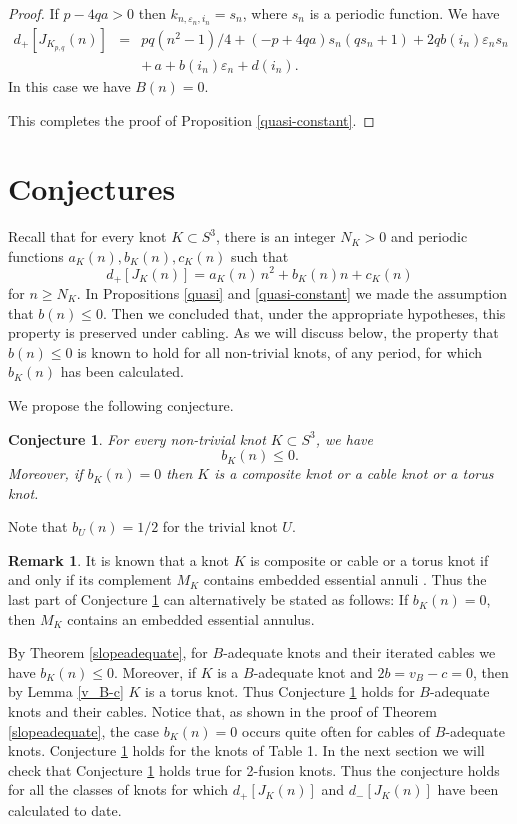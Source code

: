 \documentclass[11pt]{amsart}
\newtheorem{conjecture}[theorem]{Conjecture}
\theoremstyle{definition}
\newtheorem{remark}[theorem]{Remark}
\def\ve{\varepsilon}
\begin{document}
\begin{proof}
If $p - 4qa > 0$ then $k_{n,\ve_n,i_n} = s_n$, where $s_n$ is a periodic function. We have
\begin{eqnarray*}
d_+[J_{K_{p,q}}(n)] &=& pq (n^2-1)/4 
+ (-p + 4qa)s_n (q s_n + 1) + 2q b(i_n) \ve_n s_n\\
&& + \,  a + b(i_n) \ve_n + d(i_n).
\end{eqnarray*}
In this case we have $B(n)=0$.

This completes the proof of Proposition \ref{quasi-constant}.
\end{proof}

\section{Conjectures} Recall that for every knot $K \subset S^3$, there is an integer $N_K>0$ and periodic functions $a_{K}(n), b_{K}(n), c_{K}(n)$ such that 
$$d_+[J_K(n)] = a_{K}(n) \, n^2 + b_{K}(n) n + c_{K}(n)$$
for $n \ge N_K$.   In Propositions \ref{quasi}  and \ref{quasi-constant} we made the assumption that  $b(n) \le 0$. Then we concluded that, under the appropriate hypotheses, this property
is preserved under cabling. As we will discuss below, the property that $b(n)\leq 0$ is known to hold  
for all non-trivial knots, of any period,  for which $b_K(n)$ has been calculated.

We propose the following conjecture. 

\begin{conjecture}
\label{conj}
For every non-trivial knot $K \subset S^3$, we have $$b_K(n) \le 0.$$
Moreover, if $b_K(n)=0$ then   $K$ is a composite knot or  a cable knot or a torus knot. 
\end{conjecture}
Note that $b_U(n)=1/2$ for the trivial knot $U$. 

\begin{remark} It is known that a knot $K$ is composite or cable or a torus knot if and only if its complement $M_K$ contains  embedded essential annuli \cite[Lemma V.1.3.4]{jacoshalen}. Thus the last part of Conjecture \ref{conj} can alternatively be stated as
follows: If $b_K(n)=0$, then $M_K$ contains an embedded essential  annulus.
\end{remark}

By Theorem \ref{slopeadequate}, for $B$-adequate knots and their  iterated cables we have $b_K(n) \le 0$.
Moreover, if $K$ is a $B$-adequate knot and $2b=v_B-c=0$, then  by Lemma \ref{v_B-c}
$K$ is a torus knot.
Thus Conjecture \ref{conj} holds for $B$-adequate knots and their cables.
 Notice that,
as shown in the proof of Theorem \ref{slopeadequate}, the case $b_K(n)=0$ occurs quite often for cables of $B$-adequate knots.
Conjecture \ref{conj} holds for the knots of  Table 1. In the next section we will check that Conjecture \ref{conj} holds true for 
 2-fusion knots.
 Thus the conjecture holds for all
 the classes of knots for which
$ d_+[J_{K}(n)] $ and $ d_-[J_{K}(n)]$ have been calculated to date.
\medskip
\end{document}
